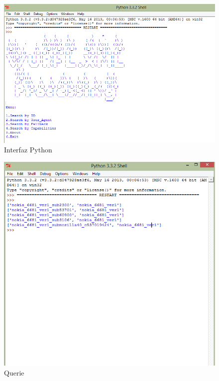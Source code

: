 \documentclass[11pt]{article} %
\begin{document}
\begin{figure}
\centering
\includegraphics[scale=0.8]{imagenes/interfaz.png}
\caption{Interfaz Python}
\label{fig: threadsVsSync}
\end{figure}


\begin{figure}
\centering
\includegraphics[scale=0.8]{imagenes/queries.png}
\caption{Querie}
\label{fig: threadsVsSync}
\end{figure}
\end{document}

